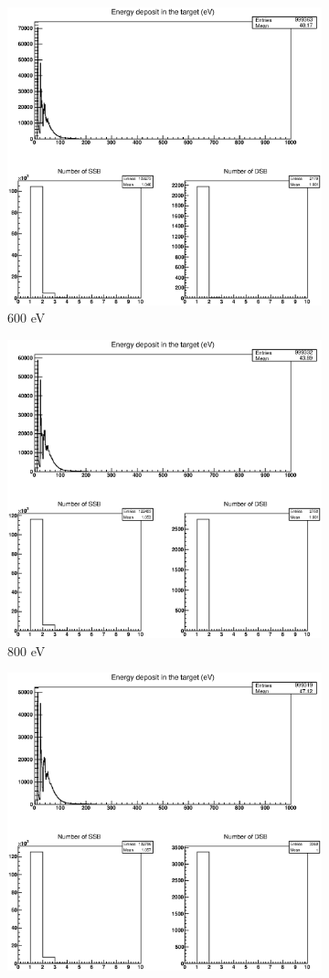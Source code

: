 \begin{figure}
\begin{subfigure}{.5\textwidth}
  \includegraphics[width=.78\linewidth]{./Figures/1fzxp600ev.eps}
  \caption{600 eV}
  \label{fig:subi3}
\end{subfigure}%
\begin{subfigure}{.5\textwidth}
  \centering
  \includegraphics[width=.78\linewidth]{./Figures/1fzxp800ev.eps}
  \caption{800 eV}
  \label{fig:subi4}
\end{subfigure}
\begin{subfigure}{.5\textwidth}
  \centering
  \includegraphics[width=.78\linewidth]{./Figures/1fzxp1kev.eps}

\end{subfigure}
\end{figure}
